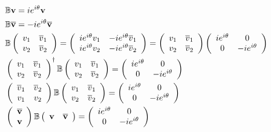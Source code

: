 \documentclass[aps,preprint]{revtex4}%
\begin{document}
\begin{align}
& \mathbb{B}\mathbf{v}=ie^{i\theta}\mathbf{v}\\
& \mathbb{B}\overline{\mathbf{v}}=-ie^{i\theta}\overline{\mathbf{v}}\\
& \mathbb{B}\left(
\begin{array}
[c]{cc}%
v_{1} & \overline{v}_{1}\\
v_{2} & \overline{v}_{2}%
\end{array}
\right)  =\left(
\begin{array}
[c]{cc}%
ie^{i\theta}v_{1} & -ie^{i\theta}\overline{v}_{1}\\
ie^{i\theta}v_{2} & -ie^{i\theta}\overline{v}_{2}%
\end{array}
\right)  =\left(
\begin{array}
[c]{cc}%
v_{1} & \overline{v}_{1}\\
v_{2} & \overline{v}_{2}%
\end{array}
\right)  \left(
\begin{array}
[c]{cc}%
ie^{i\theta} & 0\\
0 & -ie^{i\theta}%
\end{array}
\right)  \\
& \left(
\begin{array}
[c]{cc}%
v_{1} & \overline{v}_{1}\\
v_{2} & \overline{v}_{2}%
\end{array}
\right)  ^{\dagger}\mathbb{B}\left(
\begin{array}
[c]{cc}%
v_{1} & \overline{v}_{1}\\
v_{2} & \overline{v}_{2}%
\end{array}
\right)  =\left(
\begin{array}
[c]{cc}%
ie^{i\theta} & 0\\
0 & -ie^{i\theta}%
\end{array}
\right)  \\
& \left(
\begin{array}
[c]{cc}%
\overline{v}_{1} & \overline{v}_{2}\\
v_{1} & v_{2}%
\end{array}
\right)  \mathbb{B}\left(
\begin{array}
[c]{cc}%
v_{1} & \overline{v}_{1}\\
v_{2} & \overline{v}_{2}%
\end{array}
\right)  =\left(
\begin{array}
[c]{cc}%
ie^{i\theta} & 0\\
0 & -ie^{i\theta}%
\end{array}
\right)  \\
& \left(
\begin{array}
[c]{c}%
\overline{\mathbf{v}}\\
\mathbf{v}%
\end{array}
\right)  \mathbb{B}\left(
\begin{array}
[c]{cc}%
\mathbf{v} & \overline{\mathbf{v}}%
\end{array}
\right)  =\left(
\begin{array}
[c]{cc}%
ie^{i\theta} & 0\\
0 & -ie^{i\theta}%
\end{array}
\right)
\end{align}%
\end{document}
